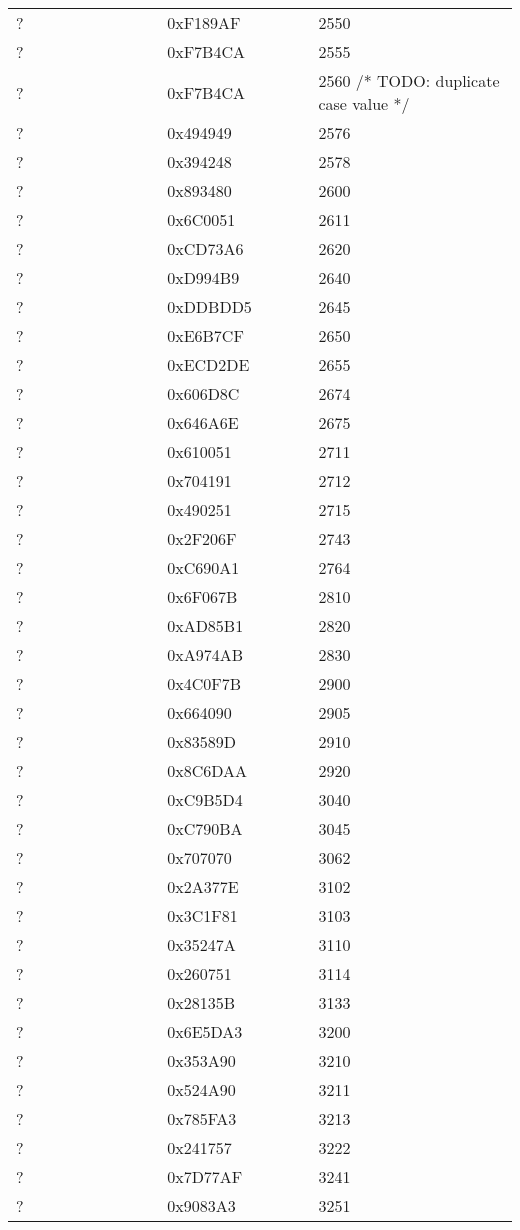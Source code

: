 \begin{longtable}{p{0.3\linewidth} p{0.3\linewidth} p{0.4\linewidth}}
? &  0xF189AF &  2550\\
? &  0xF7B4CA &  2555\\
? &  0xF7B4CA &  2560 /* TODO: duplicate case value */\\
? &  0x494949 &  2576\\
? &  0x394248 &  2578\\
? &  0x893480 &  2600\\
? &  0x6C0051 &  2611\\
? &  0xCD73A6 &  2620\\
? &  0xD994B9 &  2640\\
? &  0xDDBDD5 &  2645\\
? &  0xE6B7CF &  2650\\
? &  0xECD2DE &  2655\\
? &  0x606D8C &  2674\\
? &  0x646A6E &  2675\\
? &  0x610051 &  2711\\
? &  0x704191 &  2712\\
? &  0x490251 &  2715\\
? &  0x2F206F &  2743\\
? &  0xC690A1 &  2764\\
? &  0x6F067B &  2810\\
? &  0xAD85B1 &  2820\\
? &  0xA974AB &  2830\\
? &  0x4C0F7B &  2900\\
? &  0x664090 &  2905\\
? &  0x83589D &  2910\\
? &  0x8C6DAA &  2920\\
? &  0xC9B5D4 &  3040\\
? &  0xC790BA &  3045\\
? &  0x707070 &  3062\\
? &  0x2A377E &  3102\\
? &  0x3C1F81 &  3103\\
? &  0x35247A &  3110\\
? &  0x260751 &  3114\\
? &  0x28135B &  3133\\
? &  0x6E5DA3 &  3200\\
? &  0x353A90 &  3210\\
? &  0x524A90 &  3211\\
? &  0x785FA3 &  3213\\
? &  0x241757 &  3222\\
? &  0x7D77AF &  3241\\
? &  0x9083A3 &  3251\\

\end{longtable}
